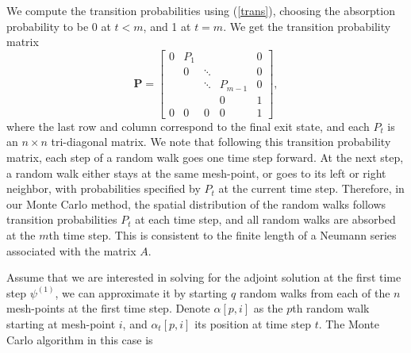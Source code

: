     We compute the transition probabilities using (\ref{trans}), choosing
    the absorption probability to be 0 at $t<m$, and 1 at $t=m$.  We get the
    transition probability matrix
    \[ \mathbf{P} =
    \begin{bmatrix}
    0 & P_1 &        &         & 0 \\
      & 0   & \ddots &         & 0 \\
      &     & \ddots & P_{m-1} & 0 \\
      &     &        & 0       & 1 \\
    0 & 0   & 0      & 0       & 1
    \end{bmatrix} , \]
    where the last row and column correspond to the final exit state,
    and each $P_t$ is an $n \times n$ tri-diagonal matrix.  We note that
    following this transition probability matrix, each step of a random
    walk goes one time step forward.  At the next step, a random walk
    either stays at the same mesh-point, or goes to its left or right
    neighbor, with probabilities specified by $P_t$ at the current
    time step.  Therefore, in our Monte Carlo method, the spatial
    distribution of the random walks follows transition probabilities
    $P_t$ at each time step, and all random walks are absorbed at the
    $m$th time step.  This is consistent to the finite length of a
    Neumann series associated with the matrix $A$.
    
    Assume that we are interested in solving for the adjoint solution at
    the first time step $\psi^{(1)}$, we can approximate it by starting
    $q$ random walks from each of the $n$ mesh-points at the first
    time step.  Denote $\alpha[p,i]$ as the $p$th random walk starting at
    mesh-point $i$, and $\alpha_t[p,i]$ its position at time step $t$.
    The Monte Carlo algorithm in this case is
    
